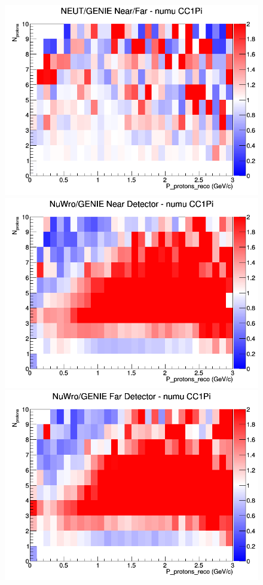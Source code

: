 \begin{figure}[h]
\endminipage
{}
\includegraphics[width=\linewidth]{eff_N_P/LAr/protons/ratios/CC1Pi_NEUT_GENIE_numu_NF_N_P.png}
\endminipage
\newline
{}
\includegraphics[width=\linewidth]{eff_N_P/LAr/protons/ratios/CC1Pi_NuWro_GENIE_numu_near_N_P.png}
\endminipage
{}
\includegraphics[width=\linewidth]{eff_N_P/LAr/protons/ratios/CC1Pi_NuWro_GENIE_numu_far_N_P.png}

\end{figure}
